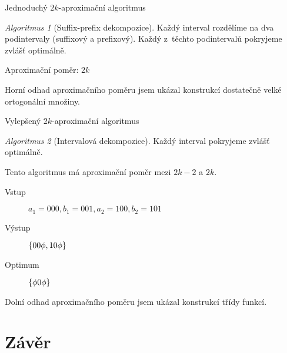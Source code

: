\documentclass{beamer}
\theoremstyle{remark}
\newtheorem{algorithm}{Algoritmus}
\begin{document}
\begin{frame}{Jednoduchý $2k$-aproximační algoritmus}


\begin{algorithm}[Suffix-prefix dekompozice]
Každý interval rozdělíme na dva podintervaly (suffixový a prefixový).
Každý z~těchto podintervalů pokryjeme zvlášť optimálně.
\end{algorithm}

Aproximační poměr: $2k$

\begin{example}
\begin{figure}
\centering

\end{figure}
\end{example}

Horní odhad aproximačního poměru jsem ukázal konstrukcí dostatečně velké ortogonální množiny.
\end{frame}

\begin{frame}{Vylepšený $2k$-aproximační algoritmus}
\begin{algorithm}[Intervalová dekompozice]
Každý interval pokryjeme zvlášť optimálně.
\end{algorithm}

Tento algoritmus má aproximační poměr mezi $2k-2$ a $2k$.

\begin{example}
\begin{description}
\item[Vstup]
$a_1 = 000, b_1 = 001, a_2 = 100, b_2 = 101$

\item[Výstup]
$\{00 \phi, 10 \phi\}$

\item[Optimum]
$\{\phi 0 \phi\}$
\end{description}
\end{example}

Dolní odhad aproximačního poměru jsem ukázal konstrukcí třídy  funkcí.
\end{frame}

\section{Závěr}
\end{document}
